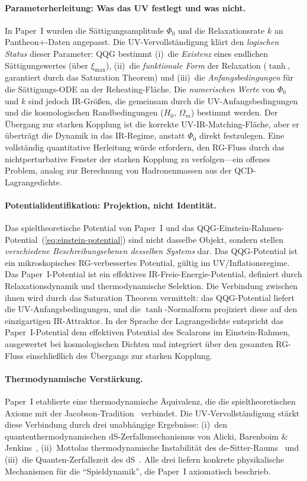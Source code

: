 \documentclass[aps,prd,twocolumn,superscriptaddress,nofootinbib]{revtex4-2}
\begin{document}
\paragraph{Parameterherleitung: Was das UV festlegt und was nicht.}
In Paper~I wurden die Sättigungsamplitude $\Phi_0$ und die Relaxationsrate $k$ an Pantheon+-Daten angepasst. Die UV-Vervollständigung klärt den \textit{logischen Status} dieser Parameter: QQG bestimmt (i)~die \textit{Existenz} eines endlichen Sättigungswertes (über $\xi_\mathrm{max}$), (ii)~die \textit{funktionale Form} der Relaxation ($\tanh$, garantiert durch das Saturation Theorem) und (iii)~die \textit{Anfangsbedingungen} für die Sättigungs-ODE an der Reheating-Fläche. Die \textit{numerischen Werte} von $\Phi_0$ und $k$ sind jedoch IR-Größen, die gemeinsam durch die UV-Anfangsbedingungen und die kosmologischen Randbedingungen ($H_0$, $\Omega_m$) bestimmt werden. Der Übergang zur starken Kopplung ist die korrekte UV-IR-Matching-Fläche, aber er überträgt die Dynamik in das IR-Regime, anstatt $\Phi_0$ direkt festzulegen. Eine vollständig quantitative Herleitung würde erfordern, den RG-Fluss durch das nichtperturbative Fenster der starken Kopplung zu verfolgen---ein offenes Problem, analog zur Berechnung von Hadronenmassen aus der QCD-Lagrangedichte.

\paragraph{Potentialidentifikation: Projektion, nicht Identität.}
Das spieltheoretische Potential von Paper~I und das QQG-Einstein-Rahmen-Potential~(\ref{eq:einstein-potential}) sind nicht dasselbe Objekt, sondern stellen \textit{verschiedene Beschreibungsebenen desselben Systems} dar. Das QQG-Potential ist ein mikroskopisches RG-verbessertes Potential, gültig im UV/Inflationsregime. Das Paper~I-Potential ist ein effektives IR-Freie-Energie-Potential, definiert durch Relaxationsdynamik und thermodynamische Selektion. Die Verbindung zwischen ihnen wird durch das Saturation Theorem vermittelt: das QQG-Potential liefert die UV-Anfangsbedingungen, und die $\tanh$-Normalform projiziert diese auf den einzigartigen IR-Attraktor. In der Sprache der Lagrangedichte entspricht das Paper~I-Potential dem effektiven Potential des Scalarons im Einstein-Rahmen, ausgewertet bei kosmologischen Dichten und integriert über den gesamten RG-Fluss einschließlich des Übergangs zur starken Kopplung.

\paragraph{Thermodynamische Verstärkung.}
Paper~I etablierte eine thermodynamische Äquivalenz, die die spieltheoretischen Axiome mit der Jacobson-Tradition~\cite{Jacobson1995} verbindet. Die UV-Vervollständigung stärkt diese Verbindung durch drei unabhängige Ergebnisse: (i)~den quantenthermodynamischen dS-Zerfallsmechanismus von Alicki, Barenboim \& Jenkins~\cite{Alicki2023,Alicki2025}, (ii)~Mottolas thermodynamische Instabilität des de-Sitter-Raums~\cite{Mottola1985,Mottola1986} und (iii)~die Quanten-Zerfallszeit des dS~\cite{DvaliGomezZell2017}. Alle drei liefern konkrete physikalische Mechanismen für die ``Spieldynamik'', die Paper~I axiomatisch beschrieb.
\end{document}
